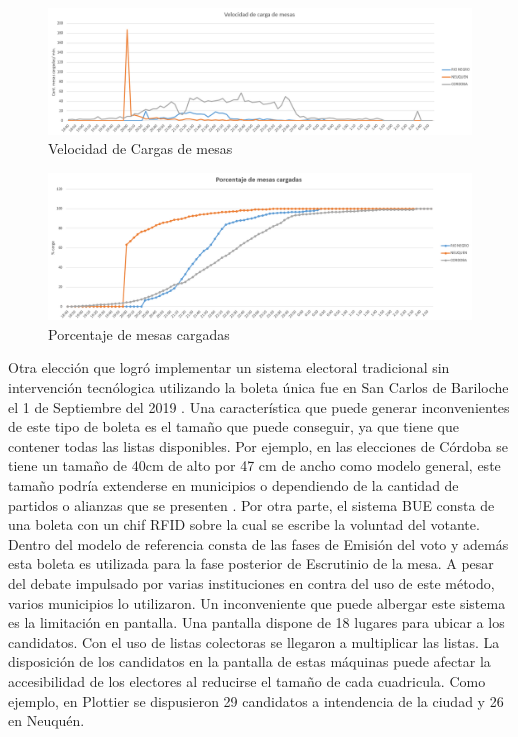 \begin{figure}[h!]
  \includegraphics[width=\textwidth]{img/grafico_velocidad_carga.png}
  \caption{Velocidad de Cargas de mesas}
  \label{fig:velocidad}
\end{figure}
\begin{figure}[h!]
  \includegraphics[width=\textwidth]{img/carga_mesas.png}
  \caption{Porcentaje de mesas cargadas}
  \label{fig:acumulado}
\end{figure}

Otra elección que logró implementar un sistema electoral tradicional sin intervención tecnólogica utilizando la boleta única fue en San Carlos de Bariloche el 1 de Septiembre del 2019 \cite{anbariloche,rnbariloche}. Una característica que puede generar inconvenientes de este tipo de boleta es el tamaño que puede conseguir, ya que tiene que contener todas las listas disponibles. Por ejemplo, en las elecciones de Córdoba se tiene un tamaño de 40cm de alto por 47 cm de ancho como modelo general, este tamaño podría extenderse en municipios o dependiendo de la cantidad de partidos o alianzas que se presenten \cite{boletaUnicaTamanio}. \newline
Por otra parte, el sistema BUE consta de una boleta con un chif RFID sobre la cual se escribe la voluntad del votante. Dentro del modelo de referencia consta de las fases de Emisión del voto y además esta boleta es utilizada para la fase posterior de Escrutinio de la mesa. A pesar del debate impulsado por varias instituciones en contra del uso de este método, varios municipios lo utilizaron. Un inconveniente que puede albergar este sistema es la limitación en pantalla. Una pantalla dispone de 18 lugares para ubicar a los candidatos. Con el uso de listas colectoras se llegaron a multiplicar las listas. La disposición de los candidatos en la pantalla de estas máquinas puede afectar la accesibilidad de los electores al reducirse el tamaño de cada cuadricula. Como ejemplo, en Plottier \cite{lmncolectoras} se dispusieron 29 candidatos a intendencia de la ciudad y 26 en Neuquén. 

